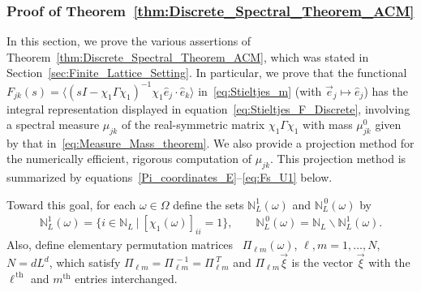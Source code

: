 \documentclass{cmslatex}
\begin{document}
\subsubsection{Proof of Theorem~\ref{thm:Discrete_Spectral_Theorem_ACM}}
\label{sec:Theorem_Proof}
%
In this section, we prove the various assertions of
Theorem~\ref{thm:Discrete_Spectral_Theorem_ACM}, which was stated in
Section~\ref{sec:Finite_Lattice_Setting}. In particular, we prove that
the functional $F_{jk}(s)=\langle(sI-\chi_1\Gamma\chi_1)^{-1}\chi_1\hat{e}_j\cdot\hat{e}_k\rangle$
in~\eqref{eq:Stieltjes_m} (with 
$\vec{e}_j\mapsto\hat{e}_j$) has the integral representation displayed in
equation~\eqref{eq:Stieltjes_F_Discrete}, involving a spectral
measure $\mu_{jk}$ of the real-symmetric matrix $\chi_1\Gamma\chi_1$ with mass
$\mu^0_{jk}$ given by that in~\eqref{eq:Measure_Mass_theorem}. We also provide a
projection method for the numerically efficient, rigorous computation of
$\mu_{jk}$. This projection method is summarized by
equations~\eqref{Pi_coordinates_E}--\eqref{eq:Fs_U1} below.    





Toward this goal, for each $\omega\in\Omega$ define the sets $\mathbb{N}_L^1(\omega)$ and
$\mathbb{N}_L^{\,0}(\omega)$ by
% 
\begin{align}\label{eq:Zero_One_indices}
  \mathbb{N}_L^1(\omega)=\{i\in\mathbb{N}_L \ | \ [\chi_1(\omega)]_{ii}=1\}, \qquad
  \mathbb{N}_L^{\,0}(\omega)=\mathbb{N}_L\backslash \mathbb{N}_L^1(\omega).
\end{align}
%
Also, define elementary permutation matrices~\cite{Demmel:1997}
$\Pi_{\ell m}(\omega)$, $\ell,m=1,\ldots,N$, $N=dL^d$, which satisfy
$\Pi_{\ell m}=\Pi_{\ell m}^{\,-1}=\Pi_{\ell m}^{\;T}$ and $\Pi_{\ell m}\vec{\xi}$ is the
vector $\vec{\xi}$ with the $\ell^{\,\text{th}}$ and $m^{\text{th}}$
entries interchanged. 
\end{document}
